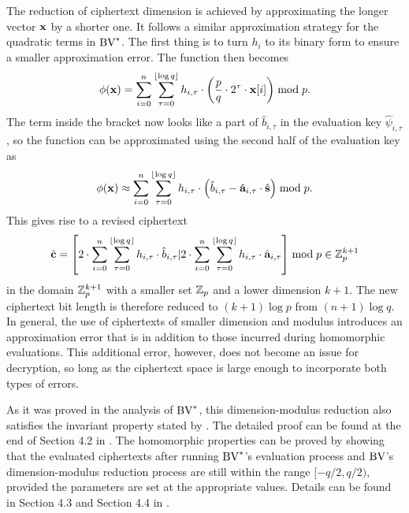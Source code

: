 \documentclass[../main.tex]{subfiles}
\begin{document}
The reduction of ciphertext dimension is achieved by approximating the longer vector $\mathbf{x}$ by a shorter one. It follows a similar approximation strategy for the quadratic terms in $\text{BV}^*$. The first thing is to turn $h_i$ to its binary form to ensure a smaller approximation error. The function then becomes 
\begin{align*}
    \phi(\mathbf{x}) = \sum_{i=0}^n \sum_{\tau=0}^{\left\lfloor{\log q}\right\rfloor} h_{i,\tau} \cdot \left({\frac{p}{q} \cdot 2^{\tau} \cdot \mathbf{x}[i]}\right) \bmod p.
\end{align*}
The term inside the bracket now looks like a part of $\hat{b}_{i,\tau}$ in the evaluation key $\hat{\psi}_{i,\tau}$, so the function can be approximated using the second half of the evaluation key as  
\begin{align*}
    \phi(\mathbf{x}) \approx \sum_{i=0}^n \sum_{\tau=0}^{\left\lfloor{\log q}\right\rfloor} h_{i,\tau} \cdot \left({\hat{b}_{i,\tau} - \hat{\mathbf{a}}_{i,\tau} \cdot \hat{\mathbf{s}}}\right) \bmod p.
\end{align*}
This gives rise to a revised ciphertext 
\begin{align*}
    \hat{\mathbf{c}} = \left[{ 2 \cdot \sum_{i=0}^n \sum_{\tau=0}^{\lfloor \log q \rfloor} h_{i,\tau} \cdot \hat{b}_{i,\tau}  \vert 2 \cdot \sum_{i=0}^n \sum_{\tau=0}^{\lfloor \log q \rfloor} h_{i,\tau} \cdot \hat{\mathbf{a}}_{i,\tau}}\right] \bmod p \in  \mathbb{Z}_p^{k+1}
\end{align*}
in the domain $\mathbb{Z}_p^{k+1}$ with a smaller set $\mathbb{Z}_p$ and a lower dimension $k+1$. The new ciphertext bit length is therefore reduced to $(k+1)\log p$ from $(n+1) \log q$. In general, the use of ciphertexts of smaller dimension and modulus introduces an approximation error that is in addition to those incurred during homomorphic evaluations. This additional error, however, does not become an issue for decryption, so long as the ciphertext space is large enough to incorporate both types of errors. 

As it was proved in the analysis of $\text{BV}^*$, this dimension-modulus reduction also satisfies the invariant property stated by . The detailed proof can be found at the end of Section 4.2 in \cite{brakerski2014efficient}. 
The homomorphic properties can be proved by showing that the evaluated ciphertexts after running $\text{BV}^*$'s evaluation process and $\text{BV}$'s dimension-modulus reduction process are still within the range $[-q/2, q/2)$, provided the parameters are set at the appropriate values. 
Details can be found in Section 4.3 and Section 4.4 in \cite{brakerski2014efficient}.
\end{document}
